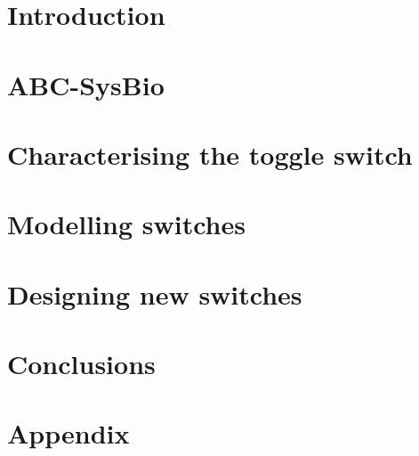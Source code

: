 \documentclass[]{phdthesis}
\begin{document}
\newpage

\setcounter{secnumdepth}{4}
\setcounter{tocdepth}{4}
\tableofcontents* 
\newpage
\listoffigures
\newpage
\listoftables
\pagestyle{plain}


\mainmatter*
\chapter{Introduction}


\mainmatter*
\chapter{ABC-SysBio}


\mainmatter*
\chapter{Characterising the toggle switch}



\mainmatter*
\chapter{Modelling switches}







\mainmatter*
\chapter{Designing new switches}


\mainmatter*
\chapter{Conclusions}

\printbibliography

\appendix*
\chapter{Appendix}

\end{document}
